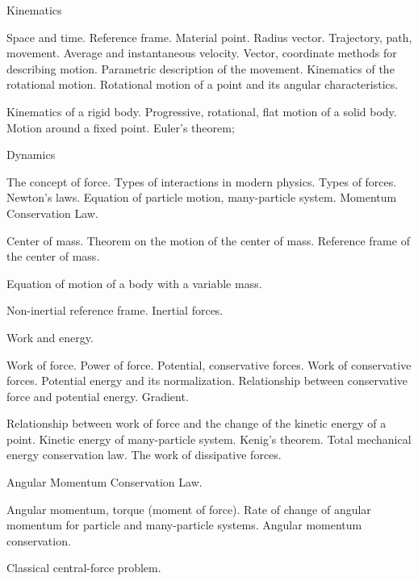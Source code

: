 \documentclass{rnp}
\begin{document}
\begin{Rozdil}
\item Kinematics
	\begin{Rozdil}
	\item  Space and time. Reference frame. Material point. Radius vector. Trajectory, path, movement. Average and instantaneous velocity. Vector, coordinate methods for describing motion. Parametric description of the movement. Kinematics of the rotational motion. Rotational motion of a point and its angular characteristics.
	\item Kinematics of a rigid body. Progressive, rotational, flat motion of a solid body. Motion around a fixed point. Euler's theorem;
	\end{Rozdil}
	\newpage
\item Dynamics
	\begin{Rozdil}
	\item The concept of force. Types of interactions in modern physics. Types of forces. Newton's laws. Equation of particle motion, many-particle system. Momentum Conservation Law.
	\item Center of mass. Theorem on the motion of the center of mass. Reference frame of the center of mass. 
	\item Equation of motion of a body with a variable mass.
	\item Non-inertial reference frame. Inertial forces.
	\end{Rozdil}
\item Work and energy.
	\begin{Rozdil}
	\item Work of force. Power of force. Potential, conservative forces. Work of conservative forces. Potential energy and its normalization. Relationship between conservative force and potential energy. Gradient.
	\item Relationship between work of force and the change of the kinetic energy of a point. Kinetic energy of many-particle system. Kenig's theorem. Total mechanical energy conservation law. The work of dissipative forces.
	\end{Rozdil}
\item Angular Momentum Conservation Law.
	\begin{Rozdil}
	\item 	Angular momentum, torque (moment of force). Rate of change of angular momentum for particle and many-particle systems. Angular momentum conservation.
	\end{Rozdil}
\item Classical central-force problem.

\end{Rozdil}
\end{document}
